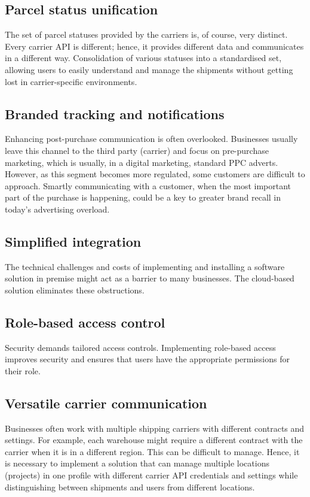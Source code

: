 \subsection{Parcel status unification}
The set of parcel statuses provided by the carriers is, of course, very distinct. Every carrier API is different; hence, it provides different data and communicates in a different way.
Consolidation of various statuses into a standardised set, allowing users to easily understand and manage the shipments without getting lost in carrier-specific environments.

\subsection{Branded tracking and notifications}
Enhancing post-purchase communication is often overlooked.
Businesses usually leave this channel to the third party (carrier) and focus on pre-purchase marketing, which is usually, in a digital marketing, standard \ac{PPC} adverts. 
However, as this segment becomes more regulated, some customers are difficult to approach.
Smartly communicating with a customer, when the most important part of the purchase is happening, could be a key to greater brand recall in today's advertising overload. 

\subsection{Simplified integration}
The technical challenges and costs of implementing and installing a software solution in premise might act as a barrier to many businesses. 
The cloud-based solution eliminates these obstructions.

\subsection{Role-based access control}
Security demands tailored access controls.
Implementing role-based access improves security and ensures that users have the appropriate permissions for their role.

\subsection{Versatile carrier communication}
Businesses often work with multiple shipping carriers with different contracts and settings. 
For example, each warehouse might require a different contract with the carrier when it is in a different region.
This can be difficult to manage. 
Hence, it is necessary to implement a solution that can manage multiple locations (projects) in one profile with different carrier API credentials and settings while distinguishing between shipments and users from different locations.



